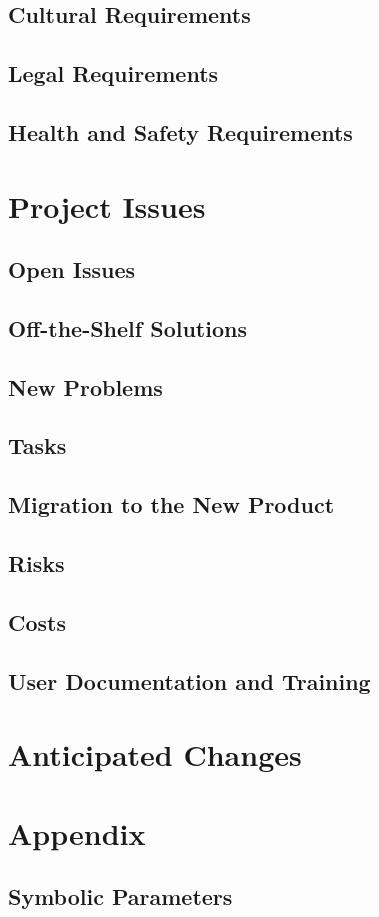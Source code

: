 \documentclass[11pt]{article}
\begin{document}
\subsection{Cultural Requirements}

\subsection{Legal Requirements}

\subsection{Health and Safety Requirements}

\section{Project Issues}

\subsection{Open Issues}
\subsection{Off-the-Shelf Solutions}
\subsection{New Problems}
\subsection{Tasks}

\subsection{Migration to the New Product}

\subsection{Risks}

\subsection{Costs}

\subsection{User Documentation and Training}

\section{Anticipated Changes}

\section{Appendix}

\subsection{Symbolic Parameters}
\end{document}
